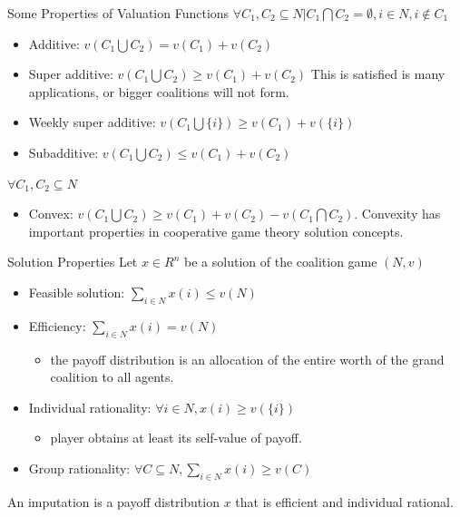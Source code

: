\documentclass{beamer}
\begin{document}
\begin{frame}{Some Properties of Valuation Functions}
    $\forall C_1,C_2 \subseteq N | C_1 \bigcap C_2 = \emptyset, i \in N, i \notin C_1$
    \begin{itemize}
        \item {\color{blue} Additive:} $v(C_1 \bigcup C_2) = v(C_1) + v(C_2)$
        \item {\color{blue} Super additive:} $v(C_1 \bigcup C_2) \geq v(C_1) + v(C_2)$ This is satisfied is many applications, or bigger coalitions will not form.
        \item {\color{blue} Weekly super additive:} $v(C_1 \bigcup \{i\}) \geq v(C_1) + v(\{i\})$
        \item {\color{red} Subadditive:} $v(C_1 \bigcup C_2) \leq v(C_1) + v(C_2)$
    \end{itemize}

    $\forall C_1,C_2 \subseteq N$
    \begin{itemize}
        \item {\color{blue} Convex:} $v(C_1 \bigcup C_2) \geq v(C_1) + v(C_2) - v(C_1 \bigcap C_2)$. Convexity has important properties in cooperative game theory solution concepts.
    \end{itemize}
\end{frame}
\begin{frame}{Solution Properties}
    Let $x \in R^n$ be a solution of the coalition game $(N,v)$
    \begin{itemize}
        \item {\color{blue} Feasible solution:} $\sum_{i \in N} x(i) \leq v(N)$
        \item {\color{blue} Efficiency:} $\sum_{i \in N} x(i) = v(N)$
        \begin{itemize}
            \item the payoff distribution is an allocation of the entire worth of the grand coalition to all agents.
        \end{itemize}
        \item {\color{blue} Individual rationality:} $\forall i \in N, x(i) \geq v(\{i\})$
        \begin{itemize}
            \item player obtains at least its self-value of payoff.
        \end{itemize}
        \item {\color{blue} Group rationality:} $\forall C \subseteq N, \sum_{i \in N} x(i) \geq v(C)$
    \end{itemize}

    \vspace{0.2cm}

    An {\color{blue} imputation} is a payoff distribution $x$ that is efficient and individual rational.

\end{frame}
\end{document}
